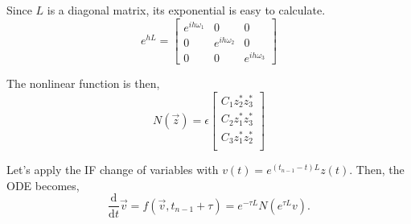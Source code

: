 \documentclass{article}
\newcommand{\ddt}{\frac{\mathrm{d}}{\mathrm{d}t}}
\theoremstyle{definition}
\begin{document}
Since $L$ is a diagonal matrix, its exponential is easy to calculate. 
\begin{equation}
e^{hL} = \begin{bmatrix}
e^{ih\omega_1} & 0 & 0\\
0 &e^{ih\omega_2} & 0 \\
0 & 0 & e^{ih\omega_3} 
\end{bmatrix}
\end{equation}

The nonlinear function is then, 
\begin{equation}
N(\vec{z}) = \epsilon \begin{bmatrix}
C_1 z_2^*z_3^* \\
C_2 z_1^*z_3^* \\
C_3 z_1^*z_2^* \\
\end{bmatrix}
\end{equation}
 
Let's apply the IF change of variables with $v(t) = e^{(t_{n-1}-t)L}z(t)$.
Then, the ODE becomes, 
\begin{equation}
\ddt \vec{v} = f(\vec{v},t_{n-1}+\tau) = e^{-\tau L} N(e^{\tau L} v).
\label{eqn:tnIFRT}
\end{equation}
\end{document}
